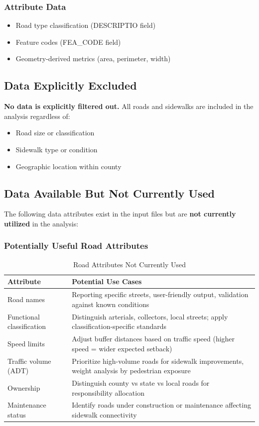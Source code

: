 \documentclass[11pt,letterpaper]{article}
\begin{document}
\subsubsection{Attribute Data}
\begin{itemize}
    \item Road type classification (DESCRIPTIO field)
    \item Feature codes (FEA\_CODE field)
    \item Geometry-derived metrics (area, perimeter, width)
\end{itemize}

\subsection{Data Explicitly Excluded}

\textbf{No data is explicitly filtered out.} All roads and sidewalks are included in the analysis regardless of:
\begin{itemize}
    \item Road size or classification
    \item Sidewalk type or condition
    \item Geographic location within county
\end{itemize}

\subsection{Data Available But Not Currently Used}

The following data attributes exist in the input files but are \textbf{not currently utilized} in the analysis:

\subsubsection{Potentially Useful Road Attributes}

\begin{table}[H]
\centering
\begin{tabular}{p{3cm}p{9cm}}
\toprule
\textbf{Attribute} & \textbf{Potential Use Cases} \\
\midrule
Road names & Reporting specific streets, user-friendly output, validation against known conditions \\
Functional classification & Distinguish arterials, collectors, local streets; apply classification-specific standards \\
Speed limits & Adjust buffer distances based on traffic speed (higher speed = wider expected setback) \\
Traffic volume (ADT) & Prioritize high-volume roads for sidewalk improvements, weight analysis by pedestrian exposure \\
Ownership & Distinguish county vs state vs local roads for responsibility allocation \\
Maintenance status & Identify roads under construction or maintenance affecting sidewalk connectivity \\
\bottomrule
\end{tabular}
\caption{Road Attributes Not Currently Used}
\label{tab:unused_road}
\end{table}
\end{document}
